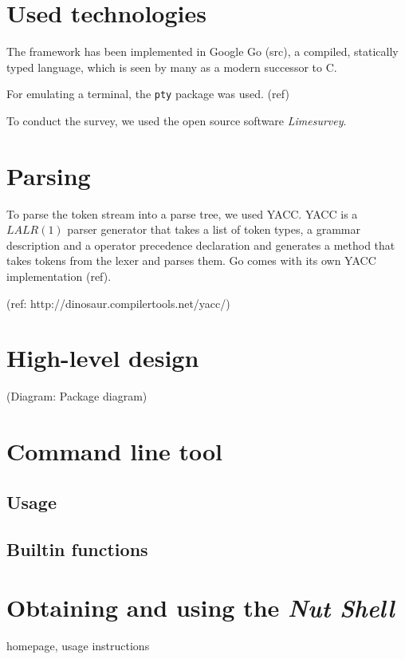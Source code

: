 \documentclass[paper=a4,twoside,abstract=on,cleardoublepage=empty,numbers=noenddot,toc=bib,12pt]{scrreprt}
\begin{document}
\section{Used technologies}

The framework has been implemented in Google Go (src), a compiled, statically typed language, which is seen by many as a modern successor to C.

For emulating a terminal, the \texttt{pty} package was used.
(ref)

To conduct the survey, we used the open source software \emph{Limesurvey}.

\section{Parsing}

To parse the token stream into a parse tree, we used \textsc{YACC}. \textsc{YACC} is a $LALR(1)$ parser generator that takes a list of token types, a grammar description and a operator precedence declaration and generates a method that takes tokens from the lexer and parses them. Go comes with its own YACC implementation (ref).

(ref: http://dinosaur.compilertools.net/yacc/)

\section{High-level design}

(Diagram: Package diagram)

\section{Command line tool}

\subsection{Usage}

\subsection{Builtin functions}

\section{Obtaining and using the \emph{Nut Shell}}

homepage, usage instructions
\end{document}
